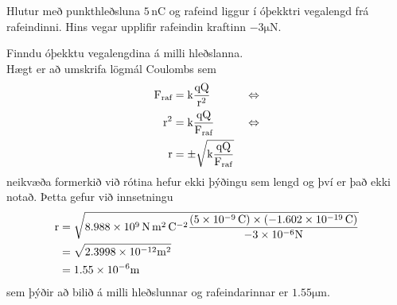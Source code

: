 \begin{formalexample}
	Hlutur með punkthleðsluna $\num{5} \, \si{\nano\coulomb}$ og
	rafeind liggur í óþekktri vegalengd frá rafeindinni. Hins vegar
	upplifir rafeindin kraftinn $\num{-3} \si{\micro\newton}$.
	\begin{center}
	\end{center}
	Finndu óþekktu vegalengdina á milli hleðslanna.
	\\[4 ex]
	Hægt er að umskrifa lögmál Coulombs sem
	\begin{align*}
		\textrm{F}_\text{raf}
		&=
		\text{k} \frac{\textrm{q} \textrm{Q}}{\textrm{r}^2} && \Leftrightarrow \\
		\textrm{r}^2
		&=
		\text{k} \frac{\textrm{q} \textrm{Q}}{\textrm{F}_\text{raf}} 
		&& \Leftrightarrow \\
		\textrm{r}
		&=
		\pm \sqrt{ \text{k} \frac{\textrm{q} \textrm{Q}}{\textrm{F}_\text{raf}} }
		\\
	\end{align*}
	neikvæða formerkið við rótina hefur ekki þýðingu sem lengd og því er
	það ekki notað. Þetta gefur við innsetningu
	\begin{align*}
		\textrm{r}
		&=
		\sqrt{ 
			\num{8.988e9} \, \si{\newton\metre\squared\per\coulomb\squared} 
			\frac{ (\num{5e-9} \, \si{\coulomb}) 
				\times (\num{-1.602e-19} \, \si{\coulomb})
				}{\num{-3e-6} \si{\newton}} 
			}
		\\
		&=
		\sqrt{ 
			\num{2.3998e-12} \si{\metre\squared}
			} \\
		&=
		\num{1.55e-6} \si{\metre}
	\end{align*}
	sem þýðir að bilið á milli hleðslunnar og rafeindarinnar er
	$\num{1.55} \si{\micro\metre}$.
\end{formalexample}

